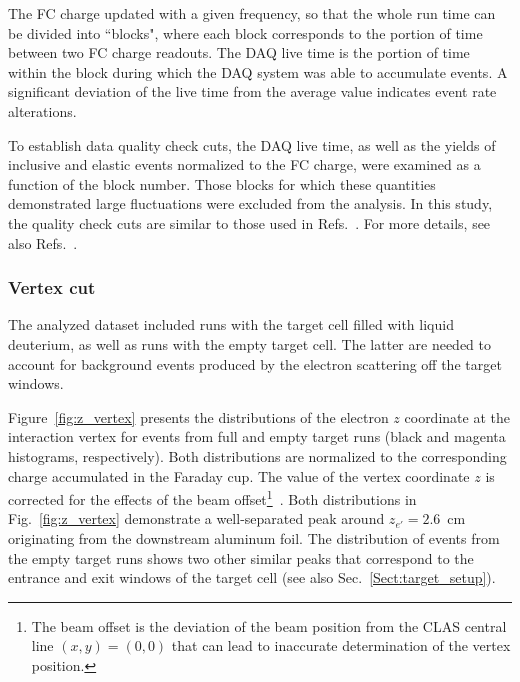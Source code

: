 \documentclass[prc,twocolumn,superscriptaddress,showpacs,amssymb,amsmath,amsfonts,aps,nofootinbib]{revtex4-1}
\begin{document}
The FC charge updated with a given frequency, so that the whole run time can be divided into ``blocks", where each block corresponds to the portion of time between two FC charge readouts. The DAQ live time is the portion of time within the block during which the DAQ system was able to accumulate events. A significant deviation of the live time from the average value indicates event rate alterations.

To establish data quality check cuts, the DAQ live time, as well as the yields of inclusive and elastic events normalized to the FC charge, were examined as a function of the block number. Those blocks for which these quantities demonstrated large fluctuations were excluded from the analysis. In this study, the quality check cuts are similar to those used in Refs.\!~\cite{Fed_an_note:2017,Fed_paper_2018}. For more details, see also Refs.\!~\cite{my_an_note:2020, my_thesis:2021}. 


\subsubsection{Vertex cut}
\label{Sect:vertex}

The analyzed dataset included runs with the target cell filled with liquid deuterium, as well as runs with the empty target cell. The latter are needed to account for background events produced by the electron scattering off the target windows. 


Figure~\ref{fig:z_vertex} presents the distributions of the electron $z$ coordinate at the interaction vertex for events from full and empty target runs (black and magenta histograms, respectively). Both distributions are normalized to the corresponding charge accumulated in the Faraday cup. The value of the vertex coordinate $z$ is corrected for the effects of the beam offset\footnote[2]{The beam offset is the deviation of the beam position from the CLAS central line $(x,y)=(0,0)$ that can lead to inaccurate determination of the vertex position.}~\cite{my_an_note:2020, my_thesis:2021}. Both distributions in Fig.\!~\ref{fig:z_vertex} demonstrate a well-separated peak around $z_{e'} = 2.6$~cm originating from the downstream aluminum foil. The distribution of events from the empty target runs shows two other similar peaks that correspond to the entrance and exit windows of the target cell (see also Sec.\!~\ref{Sect:target_setup}). 
\end{document}
